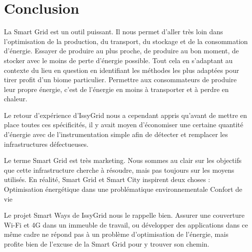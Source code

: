 \chapter*{Conclusion}

La Smart Grid est un outil puissant.
Il nous permet d'aller très loin dans l'optimisation de la production, du transport,
du stockage et de la consommation d'énergie.
Essayer de produire au plus proche, de produire au bon moment, de stocker avec le moins de perte d'énergie possible.
Tout cela en s'adaptant au contexte du lieu en question en identifiant les méthodes
les plus adaptées pour tirer profit d'un biome particulier.
Permettre aux consommateurs de produire leur propre énergie, c'est de l'énergie en moins à transporter et à perdre en chaleur.

Le retour d'expérience d'IssyGrid nous a cependant appris qu'avant de mettre en place toutes ces spécificités,
il y avait moyen d'économiser une certaine quantité d'énergie avec de l'instrumentation
simple afin de détecter et remplacer les infrastructures défectueuses.


Le terme Smart Grid est très marketing. Nous sommes au clair sur les objectifs que cette infrastructure cherche à résoudre, mais pas toujours sur les moyens utilisés.
En réalité, Smart Grid et Smart City inspirent deux choses :
Optimisation énergétique dans une problématique environnementale
Confort de vie

Le projet Smart Ways de IssyGrid nous le rappelle bien. Assurer une couverture Wi-Fi et 4G dans un immeuble de travail, ou développer des applications dans ce même cadre ne répond pas à un problème d’optimisation de l'énergie, mais profite bien de l’excuse de la Smart Grid pour y trouver son chemin.
